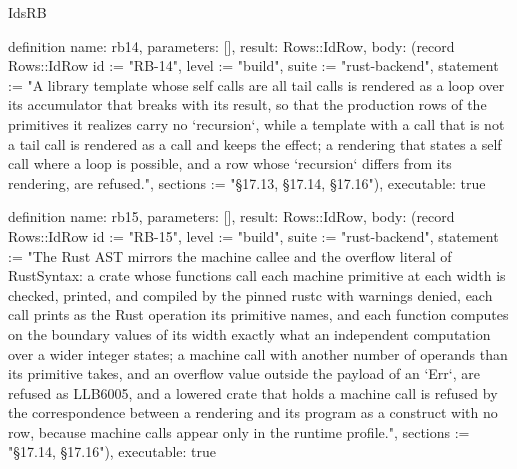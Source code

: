 \begin{lexlean}{IdsRB}
\begin{semanticmodule}
definition{
  name: rb14,
  parameters: [],
  result: Rows::IdRow,
  body: (record Rows::IdRow {id := "RB-14", level := "build", suite := "rust-backend", statement := "A library template whose self calls are all tail calls is rendered as a loop over its accumulator that breaks with its result, so that the production rows of the primitives it realizes carry no `recursion`, while a template with a call that is not a tail call is rendered as a call and keeps the effect; a rendering that states a self call where a loop is possible, and a row whose `recursion` differs from its rendering, are refused.", sections := "§17.13, §17.14, §17.16"}),
  executable: true
}

definition{
  name: rb15,
  parameters: [],
  result: Rows::IdRow,
  body: (record Rows::IdRow {id := "RB-15", level := "build", suite := "rust-backend", statement := "The Rust AST mirrors the machine callee and the overflow literal of RustSyntax: a crate whose functions call each machine primitive at each width is checked, printed, and compiled by the pinned rustc with warnings denied, each call prints as the Rust operation its primitive names, and each function computes on the boundary values of its width exactly what an independent computation over a wider integer states; a machine call with another number of operands than its primitive takes, and an overflow value outside the payload of an `Err`, are refused as LLB6005, and a lowered crate that holds a machine call is refused by the correspondence between a rendering and its program as a construct with no row, because machine calls appear only in the runtime profile.", sections := "§17.14, §17.16"}),
  executable: true
}


\end{semanticmodule}
\end{lexlean}
